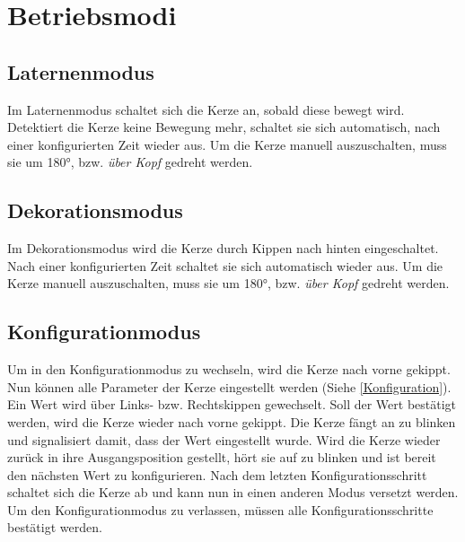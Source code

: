 \section{Betriebsmodi}

    \subsection{Laternenmodus}
        Im Laternenmodus schaltet sich die Kerze an, sobald diese bewegt wird.
        Detektiert die Kerze keine Bewegung mehr, schaltet sie sich automatisch,
        nach einer konfigurierten Zeit wieder aus.
        Um die Kerze manuell auszuschalten, muss sie um 180°, bzw. \textit{über Kopf} gedreht werden.
        
    \subsection{Dekorationsmodus}
        Im Dekorationsmodus wird die Kerze durch Kippen nach hinten eingeschaltet.
        Nach einer konfigurierten Zeit schaltet sie sich automatisch wieder aus.
        Um die Kerze manuell auszuschalten, muss sie um 180°, bzw. \textit{über Kopf} gedreht werden.

    \subsection{Konfigurationmodus}
        Um in den Konfigurationmodus zu wechseln, wird die Kerze nach vorne gekippt.
        Nun können alle Parameter der Kerze eingestellt werden (Siehe \ref{Konfiguration}).
        Ein Wert wird über Links- bzw. Rechtskippen gewechselt. Soll der Wert bestätigt werden,
        wird die Kerze wieder nach vorne gekippt. Die Kerze fängt an zu blinken und signalisiert
        damit, dass der Wert eingestellt wurde. Wird die Kerze wieder zurück in 
        ihre Ausgangsposition gestellt, hört sie auf zu blinken und 
        ist bereit den nächsten Wert zu konfigurieren.
        Nach dem letzten Konfigurationsschritt schaltet sich die Kerze ab
        und kann nun in einen anderen Modus versetzt werden.
        Um den Konfigurationmodus zu verlassen, müssen alle Konfigurationsschritte
        bestätigt werden.